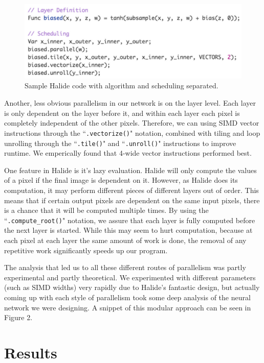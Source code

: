 \documentclass[11pt,twoside]{article}
\begin{document}
\begin{figure}
\centering
\includegraphics[scale=.7]{halide.png}
\caption{Sample Halide code with algorithm and scheduling separated.}
\end{figure}

Another, less obvious parallelism in our network is on the layer level.
Each layer is only dependent on the layer before it, and within each layer each pixel is completely independent of the other pixels.
Therefore, we can using SIMD vector instructions through the ``\texttt{.vectorize()}" notation, combined with tiling and loop unrolling through the ``\texttt{.tile()}" and ``\texttt{.unroll()}" instructions to improve runtime.
We emperically found that 4-wide vector instructions performed best.

One feature in Halide is it's lazy evaluation.
Halide will only compute the values of a pixel if the final image is dependent on it.
However, as Halide does its computation, it may perform different pieces of different layers out of order.
This means that if certain output pixels are dependent on the same input pixels, there is a chance that it will be computed multiple times.
By using the ``\texttt{.compute\_root()}" notation, we assure that each layer is fully computed before the next layer is started.
While this may seem to hurt computation, because at each pixel at each layer the same amount of work is done, the removal of any repetitive work significantly speeds up our program.

The analysis that led us to all these different routes of parallelism was partly experimental and partly theoretical.  
We experimented with different parameters (such as SIMD widths) very rapidly due to Halide's fantastic design, but actually coming up with each style of parallelism took some deep analysis of the neural network we were designing.
A snippet of this modular approach can be seen in Figure 2.

\section{Results}
\end{document}
